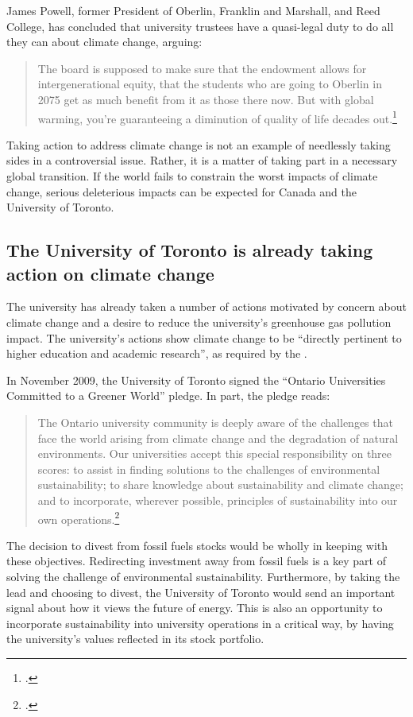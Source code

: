 James Powell, former President of Oberlin, Franklin and Marshall, and Reed College, has concluded that university trustees have a quasi-legal duty to do all they can about climate change, arguing:
\begin{quotation}
The board is supposed to make sure that the endowment allows for intergenerational equity, that the students who are going to Oberlin in 2075 get as much benefit from it as those there now. But with global warming, you’re guaranteeing a diminution of quality of life decades out.\footcite[][]{CaseForDivestment}
\end{quotation}
Taking action to address climate change is not an example of needlessly taking sides in a controversial issue. Rather, it is a matter of taking part in a necessary global transition. 
If the world fails to constrain the worst impacts of climate change, serious deleterious impacts can be expected for Canada and the University of Toronto.



	\subsection{The University of Toronto is already taking action on climate change}
	\label{UTTakenSides}

The university has already taken a number of actions motivated by concern about climate change and a desire to reduce the university's greenhouse gas pollution impact.
The university's actions show climate change to be ``directly pertinent to higher education and academic research'', as required by the .



In November 2009, the University of Toronto signed the ``Ontario Universities Committed to a Greener World'' pledge. In part, the pledge reads:
\begin{quote}
The Ontario university community is deeply aware of the challenges that face the world arising from climate change and the degradation of natural environments. Our universities accept this special responsibility on three scores: to assist in finding solutions to the challenges of environmental sustainability; to share knowledge about sustainability and climate change; and to incorporate, wherever possible, principles of sustainability into our own operations.\footcite[][]{OntarioPledge}
\end{quote}
The decision to divest from fossil fuels stocks would be wholly in keeping with these objectives.
Redirecting investment away from fossil fuels is a key part of solving the challenge of environmental sustainability.
Furthermore, by taking the lead and choosing to divest, the University of Toronto would send an important signal about how it views the future of energy.
This is also an opportunity to incorporate sustainability into university operations in a critical way, by having the university's values reflected in its stock portfolio.



